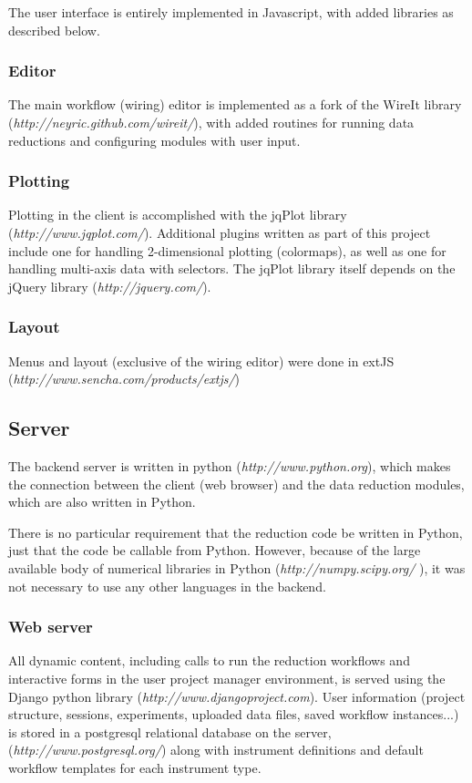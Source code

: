 \documentclass[pdf]{iucr}           %
\begin{document}
The user interface is entirely implemented in Javascript, with added libraries as described below.
 
\subsubsection{Editor}
The main workflow (wiring) editor is implemented as a fork of the WireIt library (\emph{http://neyric.github.com/wireit/}), with added routines for running data reductions and configuring
modules with user input.
\subsubsection{Plotting}
Plotting in the client is accomplished with the jqPlot library (\emph{http://www.jqplot.com/}).
Additional plugins written as part of this project include one for handling 2-dimensional 
plotting (colormaps), as well as one for handling multi-axis data with selectors.
The jqPlot library itself depends on the jQuery library (\emph{http://jquery.com/}).
\subsubsection{Layout}
Menus and layout (exclusive of the wiring editor) were done in extJS (\emph{http://www.sencha.com/products/extjs/})
\subsection{Server}
The backend server is written in python (\emph{http://www.python.org}), 
which makes the connection between the client (web browser) and the data reduction modules, 
which are also written in Python.  

There is no particular requirement that the reduction code be written in Python, just that
the code be callable from Python.  However, because of the large available body of numerical libraries 
in Python (\emph{http://numpy.scipy.org/} \cite{oliphant:10}), 
it was not necessary to use any other languages in the backend.
\subsubsection{Web server}
All dynamic content, including calls to run the reduction workflows and
interactive forms in the user project manager environment,
is served using the Django python library \cite{django_website} (\emph{http://www.djangoproject.com}).  
User information (project structure, sessions, experiments, uploaded data files, saved workflow instances...)
is stored in a postgresql relational database on the server, (\emph{http://www.postgresql.org/})
along with instrument definitions and default workflow templates
for each instrument type.
\end{document}
